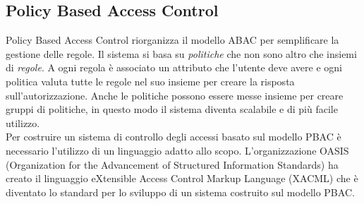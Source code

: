 \subsection{Policy Based Access Control}
\label{sub:PBAC}
Policy Based Access Control riorganizza il modello ABAC per semplificare la gestione delle regole.
Il sistema si basa su \emph{politiche} che non sono altro che insiemi di \emph{regole}. A ogni regola è associato un attributo
che l'utente deve avere e ogni politica valuta tutte le regole nel suo insieme per creare la risposta sull'autorizzazione. Anche
le politiche possono essere messe insieme per creare gruppi di politiche, in questo modo il sistema diventa scalabile e di
più facile utilizzo.\\
Per costruire un sistema di controllo degli accessi basato sul modello PBAC è necessario l'utilizzo di
un linguaggio adatto allo scopo. L'organizzazione OASIS (Organization for the Advancement of
 Structured Information Standards) ha creato il linguaggio eXtensible Access
Control Markup Language (XACML) che è diventato lo standard per lo sviluppo di un sistema costruito sul modello PBAC.
